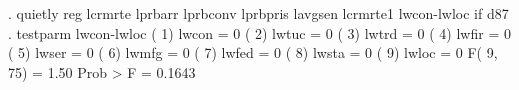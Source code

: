 . quietly reg lcrmrte lprbarr lprbconv lprbpris lavgsen lcrmrte1 lwcon-lwloc if d87
{\smallskip}
. testparm lwcon-lwloc
{\smallskip}
 ( 1)  lwcon = 0
 ( 2)  lwtuc = 0
 ( 3)  lwtrd = 0
 ( 4)  lwfir = 0
 ( 5)  lwser = 0
 ( 6)  lwmfg = 0
 ( 7)  lwfed = 0
 ( 8)  lwsta = 0
 ( 9)  lwloc = 0
{\smallskip}
       F(  9,    75) =    1.50
            Prob > F =    0.1643
{\smallskip}
